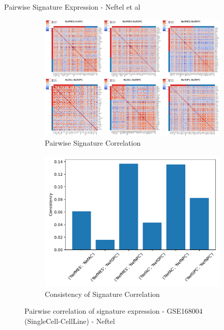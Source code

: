 \documentclass[aspectratio=169,9pt]{beamer}
\begin{document}
    \begin{frame}{Pairwise Signature Expression - Neftel et al}
        \begin{adjustwidth}{-5cm}{-5cm}
            \centering
            \begin{figure}
                \centering
                \begin{subfigure}[c]{0.7\textwidth}
                    \centering
                    \includegraphics[width=\textwidth]{mgg23_Corrplot_pair-Nef}
                    \caption{Pairwise Signature Correlation}
                \end{subfigure}
                \begin{subfigure}[c]{0.4\textwidth}
                    \centering
                    \includegraphics[width=\textwidth]{mgg23_Consistency_Nef}
                    \caption{Consistency of Signature Correlation}
                \end{subfigure}
                \caption{Pairwise correlation of signature expression - GSE168004 (SingleCell-CellLine) - Neftel}
            \end{figure}
        \end{adjustwidth}
    \end{frame}
\end{document}
